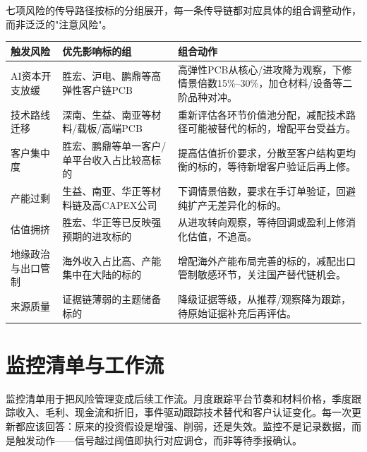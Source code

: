 七项风险的传导路径按标的分组展开，每一条传导链都对应具体的组合调整动作，而非泛泛的"注意风险"。

\vspace{0.5em}

\begin{dashboardbox}[风险传导与动作映射]
\small
\begin{tabularx}{\textwidth}{L{2.5cm} L{4cm} X}
\toprule
\textbf{触发风险} & \textbf{优先影响标的组} & \textbf{组合动作} \\
\midrule
AI资本开支放缓 & 胜宏、沪电、鹏鼎等高弹性客户链PCB & 高弹性PCB从核心/进攻降为观察，下修情景倍数15\%--30\%，加仓材料/设备等二阶品种对冲。 \\
技术路线迁移 & 深南、生益、南亚等材料/载板/高端PCB & 重新评估各环节价值池分配，减配技术路径可能被替代的标的，增配平台受益方。 \\
客户集中度 & 胜宏、鹏鼎等单一客户/单平台收入占比较高标的 & 提高估值折价要求，分散至客户结构更均衡的标的，等待新增客户验证后再上修。 \\
产能过剩 & 生益、南亚、华正等材料链及高CAPEX公司 & 下调情景倍数，要求在手订单验证，回避纯扩产无差异化的标的。 \\
估值拥挤 & 胜宏、华正等已反映强预期的进攻标的 & 从进攻转向观察，等待回调或盈利上修消化估值，不追高。 \\
地缘政治与出口管制 & 海外收入占比高、产能集中在大陆的标的 & 增配海外产能布局完善的标的，减配出口管制敏感环节，关注国产替代链机会。 \\
来源质量 & 证据链薄弱的主题储备标的 & 降级证据等级，从推荐/观察降为跟踪，待原始证据补充后再评估。 \\
\bottomrule
\end{tabularx}
\end{dashboardbox}

\section{监控清单与工作流}

监控清单用于把风险管理变成后续工作流。月度跟踪平台节奏和材料价格，季度跟踪收入、毛利、现金流和折旧，事件驱动跟踪技术替代和客户认证变化。每一次更新都应该回答：原来的投资假设是增强、削弱，还是失效。监控不是记录数据，而是触发动作——信号越过阈值即执行对应调仓，而非等待季报确认。

